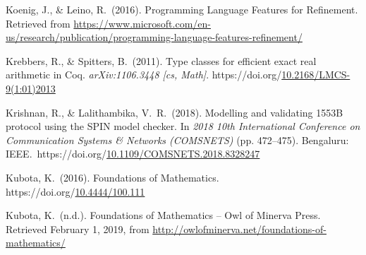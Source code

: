 \documentclass[12pt,twoside]{article}
\begin{document}
{\begin{thebibliography}{222}
\mdbibitemlabel{}Koenig, J., \& Leino, R.~(2016). Programming Language Features for Refinement. Retrieved from \href{https://www.microsoft.com/en-us/research/publication/programming-language-features-refinement/}{{\ttfamily https://\hspace{0pt}www.\hspace{0pt}microsoft.\hspace{0pt}com/\hspace{0pt}en-\hspace{0pt}us/\hspace{0pt}research/\hspace{0pt}publication/\hspace{0pt}programming-\hspace{0pt}language-\hspace{0pt}features-\hspace{0pt}refinement/\hspace{0pt}}}\label{koenig_programming_2016}%

\mdbibitemlabel{}Krebbers, R., \& Spitters, B.~(2011). Type classes for efficient exact real arithmetic in Coq. \emph{arXiv:1106.3448 {}[cs, Math]}. https://doi.org/\href{https://dx.doi.org/10.2168/LMCS-9\%25281:01\%25292013}{10.2168/LMCS-9(1:01)2013}\label{krebbers_type_2011}%

\mdbibitemlabel{}Krishnan, R., \& Lalithambika, V.~R.~(2018). Modelling and validating 1553B protocol using the SPIN model checker. In \emph{2018 10th International Conference on Communication Systems \& Networks (COMSNETS)} (pp. 472–475). Bengaluru: IEEE.~https://doi.org/\href{https://dx.doi.org/10.1109/COMSNETS.2018.8328247}{10.1109/COMSNETS.2018.8328247}\label{krishnan_modelling_2018}%

\mdbibitemlabel{}Kubota, K.~(2016). Foundations of Mathematics. https://doi.org/\href{https://dx.doi.org/10.4444/100.111}{10.4444/100.111}\label{kubota_foundations_2016}%

\mdbibitemlabel{}Kubota, K.~(n.d.). Foundations of Mathematics – Owl of Minerva Press. Retrieved February 1, 2019, from \href{http://owlofminerva.net/foundations-of-mathematics/}{{\ttfamily http://\hspace{0pt}owlofminerva.\hspace{0pt}net/\hspace{0pt}foundations-\hspace{0pt}of-\hspace{0pt}mathematics/\hspace{0pt}}}\label{kubota_foundations_nodate}%


\end{thebibliography}}
\end{document}
